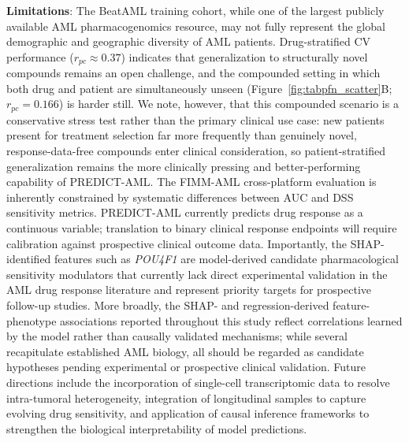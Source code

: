\documentclass[pdflatex,sn-mathphys-num]{sn-jnl}
\theoremstyle{thmstyleone}
\theoremstyle{thmstyletwo}
\theoremstyle{thmstylethree}
\begin{document}
\textbf{Limitations}: The BeatAML training cohort, while one of the largest publicly available AML pharmacogenomics resource, may not fully represent the global demographic and geographic diversity of AML patients. Drug-stratified CV performance ($r_{pc} \approx 0.37$) indicates that generalization to structurally novel compounds remains an open challenge, and the compounded setting in which both drug and patient are simultaneously unseen (Figure~\ref{fig:tabpfn_scatter}B; $r_{pc} = 0.166$) is harder still. We note, however, that this compounded scenario is a conservative stress test rather than the primary clinical use case: new patients present for treatment selection far more frequently than genuinely novel, response-data-free compounds enter clinical consideration, so patient-stratified generalization remains the more clinically pressing and better-performing capability of PREDICT-AML. The FIMM-AML cross-platform evaluation is inherently constrained by systematic differences between AUC and DSS sensitivity metrics. PREDICT-AML currently predicts drug response as a continuous variable; translation to binary clinical response endpoints will require calibration against prospective clinical outcome data. Importantly, the SHAP-identified features such as %
\textit{POU4F1} are model-derived candidate pharmacological sensitivity modulators that currently lack direct experimental validation in the AML drug response literature and represent priority targets for prospective follow-up studies. More broadly, the SHAP- and regression-derived feature-phenotype associations reported throughout this study reflect correlations learned by the model rather than causally validated mechanisms; while several recapitulate established AML biology, all should be regarded as candidate hypotheses pending experimental or prospective clinical validation. Future directions include the incorporation of single-cell transcriptomic data to resolve intra-tumoral heterogeneity, integration of longitudinal samples to capture evolving drug sensitivity, and application of causal inference frameworks to strengthen the biological interpretability of model predictions.

\end{document}
